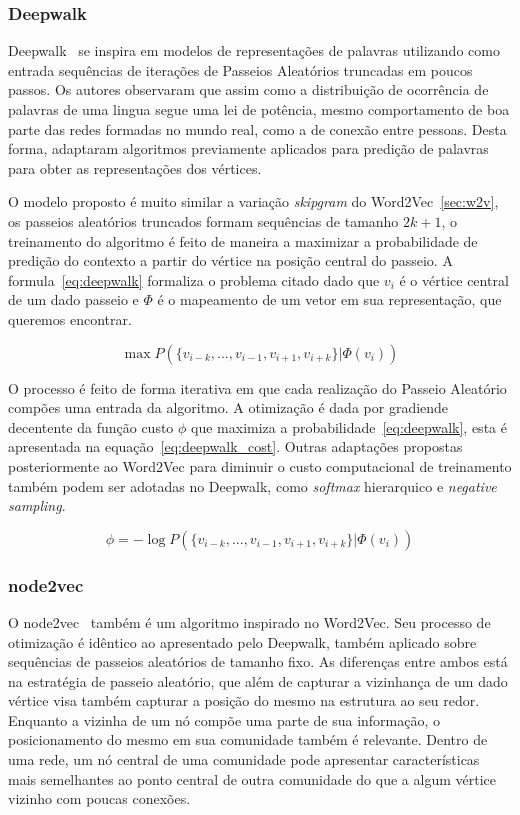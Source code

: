 \subsubsection{Deepwalk}

Deepwalk~\cite{perozzi14} se inspira em modelos de representações de palavras
utilizando como entrada sequências de iterações de Passeios Aleatórios truncadas
em poucos passos.
Os autores observaram que assim como a distribuição de ocorrência de palavras de
uma lingua segue uma lei de potência, mesmo comportamento de boa parte das redes
formadas no mundo real, como a de conexão entre pessoas.
Desta forma, adaptaram algoritmos previamente aplicados para predição de
palavras para obter as representações dos vértices.

O modelo proposto é muito similar a variação \textit{skipgram} do
Word2Vec~\ref{sec:w2v}, os passeios aleatórios truncados formam sequências de
tamanho $2k + 1$, o treinamento do algoritmo é feito de maneira a maximizar a
probabilidade de predição do contexto a partir do vértice na posição central do
passeio.
A formula~\ref{eq:deepwalk} formaliza o problema citado dado que $v_i$ é o
vértice central de um dado passeio e $\Phi$ é o mapeamento de um vetor em sua
representação, que queremos encontrar.

\begin{equation} \label{eq:deepwalk}
    \operatorname{max} P(\{v_{i-k},..., v_{i-1},v_{i+1},v_{i+k}\}|\Phi(v_i))
\end{equation}

O processo é feito de forma iterativa em que cada realização do Passeio
Aleatório compões uma entrada da algoritmo.
A otimização é dada por gradiende decentente da função custo $\phi$ que maximiza
a probabilidade~\ref{eq:deepwalk}, esta é apresentada na
equação~\ref{eq:deepwalk_cost}.
Outras adaptações propostas posteriormente ao Word2Vec para diminuir o custo
computacional de treinamento também podem ser adotadas no Deepwalk, como
\textit{softmax} hierarquico e \textit{negative sampling}.

\begin{equation} \label{eq:deepwalk_cost}
    \phi = -\log P(\{v_{i-k},..., v_{i-1},v_{i+1},v_{i+k}\}|\Phi(v_i))
\end{equation}

\subsubsection{node2vec}

O node2vec~\cite{grover16} também é um algoritmo inspirado no Word2Vec.
Seu processo de otimização é idêntico ao apresentado pelo Deepwalk, também
aplicado sobre sequências de passeios aleatórios de tamanho fixo.
As diferenças entre ambos está na estratégia de passeio aleatório, que além de
capturar a vizinhança de um dado vértice visa também capturar a posição do mesmo
na estrutura ao seu redor.
Enquanto a vizinha de um nó compõe uma parte de sua informação, o posicionamento
do mesmo em sua comunidade também é relevante.
Dentro de uma rede, um nó central de uma comunidade pode apresentar
características mais semelhantes ao ponto central de outra comunidade
do que a algum vértice vizinho com poucas conexões.

